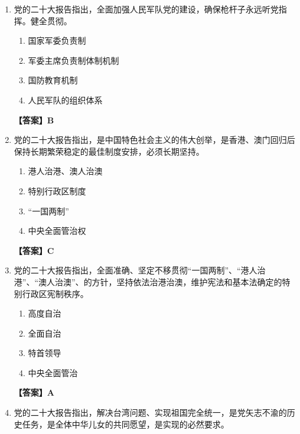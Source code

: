 \documentclass[UTF8,11pt,a4paper]{ctexart}
\begin{document}
\begin{enumerate}[label=\textbf{\arabic*.}, leftmargin=2.5em, itemsep=0.7em]
\begin{enumerate}[label=\Alph*., leftmargin=2em, itemsep=0.1em, topsep=0.15em]
\item 战略要求
\item 使命
\item 安全保障
\end{enumerate}
\textbf{【答案】B}
\item 党的二十大报告指出，全面加强人民军队党的建设，确保枪杆子永远听党指挥。健全贯彻\allowbreak\underline{\hspace{4em}}。
\begin{enumerate}[label=\Alph*., leftmargin=2em, itemsep=0.1em, topsep=0.15em]
\item 国家军委负责制
\item 军委主席负责制体制机制
\item 国防教育机制
\item 人民军队的组织体系
\end{enumerate}
\textbf{【答案】B}
\item 党的二十大报告指出，\allowbreak\underline{\hspace{4em}}是中国特色社会主义的伟大创举，是香港、澳门回归后保持长期繁荣稳定的最佳制度安排，必须长期坚持。
\begin{enumerate}[label=\Alph*., leftmargin=2em, itemsep=0.1em, topsep=0.15em]
\item 港人治港、澳人治澳
\item 特别行政区制度
\item “一国两制”
\item 中央全面管治权
\end{enumerate}
\textbf{【答案】C}
\item 党的二十大报告指出，全面准确、坚定不移贯彻“一国两制”、“港人治港”、“澳人治澳”、\allowbreak\underline{\hspace{4em}}的方针，坚持依法治港治澳，维护宪法和基本法确定的特别行政区宪制秩序。
\begin{enumerate}[label=\Alph*., leftmargin=2em, itemsep=0.1em, topsep=0.15em]
\item 高度自治
\item 全面自治
\item 特首领导
\item 中央全面管治
\end{enumerate}
\textbf{【答案】A}
\item 党的二十大报告指出，解决台湾问题、实现祖国完全统一，是党矢志不渝的历史任务，是全体中华儿女的共同愿望，是实现\allowbreak\underline{\hspace{4em}}的必然要求。
\begin{enumerate}[label=\Alph*., leftmargin=2em, itemsep=0.1em, topsep=0.15em]

\end{enumerate}
\end{enumerate}
\end{document}
